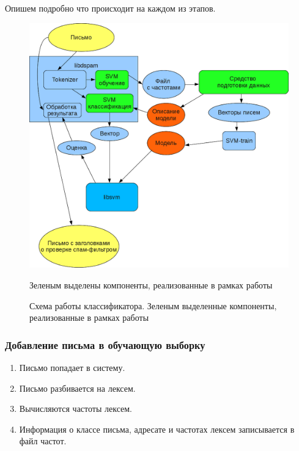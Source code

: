 Опишем подробно что происходит на каждом из этапов.

\begin{figure}[h]
\begin{center}
\includegraphics[width=12cm]{img/working_scheme2}
\end{center}
Зеленым выделены компоненты, реализованные в рамках работы\caption{Схема работы классификатора. Зеленым выделенные компоненты, реализованные в рамках работы}
\label{dspamarch}
\end{figure}

\subsubsection{Добавление письма в обучающую выборку}

\begin{enumerate}
    \item Письмо попадает в систему.
    \item Письмо разбивается на лексем.
    \item Вычисляются частоты лексем.
    \item Информация о классе письма, адресате и частотах лексем записывается в файл частот.
\end{enumerate}

